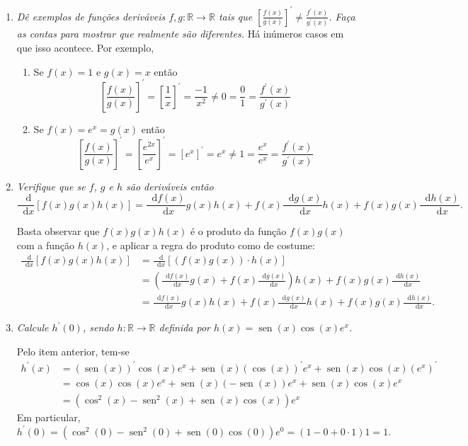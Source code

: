 \documentclass[12pt,a4paper]{article}
\newcommand*\diff{\mathop{}\!\mathrm{d}}
\newcommand*\sen{\operatorname{sen}}
\begin{document}
\begin{enumerate}
\item \textit{Dê exemplos de funções deriváveis $f, g: \mathbb{R} \to \mathbb{R}$ tais que $\left[\frac{f(x)}{g(x)} \right]^\prime \neq \frac{f^\prime(x) }{ g^\prime(x) }$. Faça as contas para mostrar que realmente são diferentes.}
Há inúmeros casos em que isso acontece. Por exemplo,
\begin{enumerate}
\item Se $f(x) = 1$ e $g(x) = x$ então
\[
\left[\frac{f(x)}{g(x)} \right]^\prime
= \left[\frac{1}{x} \right]^\prime
= \frac{-1}{x^2}
\neq 0
= \frac{0 }{ 1 }
= \frac{f^\prime(x) }{ g^\prime(x) }
\]

\item Se $f(x) = e^x = g(x)$ então
\[
\left[\frac{f(x)}{g(x)} \right]^\prime
= \left[\frac{e^{2x}}{e^x} \right]^\prime
= \left[ e^x \right]^\prime
= e^x
\neq 1
= \frac{e^x }{ e^x }
= \frac{f^\prime(x) }{ g^\prime(x) }
\]


\end{enumerate}

\item \textit{Verifique que se $f$, $g$ e $h$ são deriváveis então}
\[
\frac{ \diff{} }{\diff{x}}\left[f(x) g(x) h(x) \right]
=
  \frac{ \diff{f(x)} }{\diff{x}} g(x) h(x)
+ f(x) \frac{\diff{g(x)} }{\diff{x}} h(x)
+ f(x) g(x) \frac{\diff{h(x)} }{\diff{x}}.
\]

Basta observar que $f(x) g(x) h(x)$ é o produto da função $f(x) g(x)$ com a função $h(x)$, e aplicar a regra do produto como de costume:
\begin{align*}
\frac{ \diff{} }{\diff{x}}\left[f(x) g(x) h(x) \right]
& = \frac{ \diff{} }{\diff{x}}\left[(f(x) g(x)) \cdot h(x) \right] \\
& =
\left( \frac{ \diff{f(x)} }{\diff{x}} g(x)
+ f(x) \frac{\diff{g(x)} }{\diff{x}} \right) h(x)
+ f(x) g(x) \frac{\diff{h(x)} }{\diff{x}} \\
& =
  \frac{ \diff{f(x)} }{\diff{x}} g(x) h(x)
+ f(x) \frac{\diff{g(x)} }{\diff{x}} h(x)
+ f(x) g(x) \frac{\diff{h(x)} }{\diff{x}}.
\end{align*}

\item \textit{Calcule $h^\prime(0)$, sendo $h: \mathbb{R} \to \mathbb{R}$ definida por $h(x) = \sen(x) \cos(x) e^x$.}

Pelo item anterior, tem-se
\begin{align*}
h^\prime(x)
& = (\sen(x))^\prime \cos(x) e^x + \sen(x) (\cos(x))^\prime e^x + \sen(x) \cos(x) (e^x)^\prime \\
& = \cos(x) \cos(x) e^x + \sen(x) (-\sen(x)) e^x + \sen(x) \cos(x) e^x \\
& = (\cos^2(x) - \sen^2(x) + \sen(x) \cos(x)) e^x
\end{align*}
Em particular, $h^\prime(0) = (\cos^2(0) - \sen^2(0) + \sen(0) \cos(0)) e^0 = (1 - 0 + 0 \cdot 1) 1 = 1.$


\end{enumerate}
\end{document}
